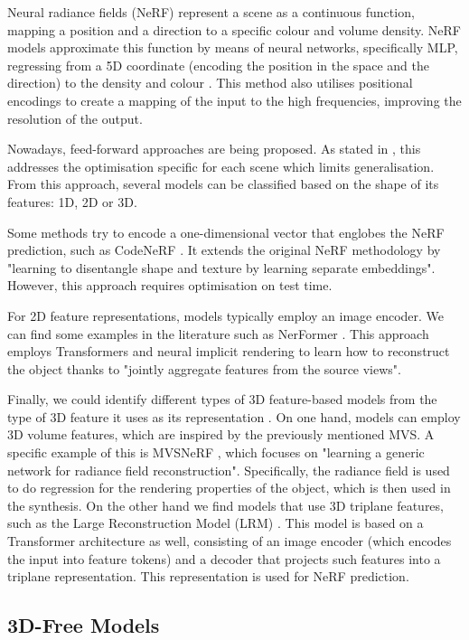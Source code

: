 \documentclass[
	a4paper, %
	10pt, %
	unnumberedsections, %
	twoside, %
]{LTJournalArticle}
\begin{document}
Neural radiance fields (NeRF) represent a scene as a continuous function, mapping a position and a direction to a specific colour and volume density. NeRF models approximate this function by means of neural networks, specifically MLP, regressing from a 5D coordinate (encoding the position in the space and the direction) to the density and colour \cite{mildenhall2020nerf}. This method also utilises positional encodings to create a mapping of the input to the high frequencies, improving the resolution of the output.

Nowadays, feed-forward approaches are being proposed. As stated in \cite{feedforward_nerf_survey}, this addresses the optimisation specific for each scene which limits generalisation. From this approach, several models can be classified based on the shape of its features: 1D, 2D or 3D.

Some methods try to encode a one-dimensional vector that englobes the NeRF prediction, such as CodeNeRF \cite{jang2021codenerf}. It extends the original NeRF methodology by "learning to disentangle shape and texture by learning separate embeddings". However, this approach requires optimisation on test time.

For 2D feature representations, models typically employ an image encoder. We can find some examples in the literature such as NerFormer \cite{reizenstein2021nerformer}. This approach employs Transformers and neural implicit rendering to learn how to reconstruct the object thanks to "jointly aggregate features from the source views".

Finally, we could identify different types of 3D feature-based models from the type of 3D feature it uses as its representation \cite{feedforward_nerf_survey}. On one hand, models can employ 3D volume features, which are inspired by the previously mentioned MVS. A specific example of this is MVSNeRF \cite{chen2021mvsnerf}, which focuses on "learning a generic network for radiance field reconstruction". Specifically, the radiance field is used to do regression for the rendering properties of the object, which is then used in the synthesis. On the other hand we find models that use 3D triplane features, such as the Large Reconstruction Model (LRM) \cite{hong2023lrm}. This model is based on a Transformer architecture as well, consisting of an image encoder (which encodes the input into feature tokens) and a decoder that projects such features into a triplane representation. This representation is used for NeRF prediction.

\subsection{3D-Free Models}
\end{document}
